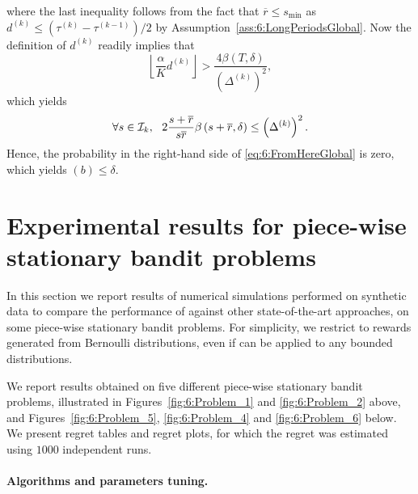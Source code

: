%
where the last inequality follows from the fact that $\overline{r} \leq s_{\min}$ as $d^{(k)} \leq (\tau^{(k)} - \tau^{(k-1)})/2$ by Assumption~\ref{ass:6:LongPeriodsGlobal}. Now the definition of $d^{(k)}$ readily implies that
\[\left\lfloor \frac{\alpha}{K}d^{(k)}\right\rfloor > \frac{4\beta(T,\delta)}{\left(\Delta^{(k)}\right)^2},\]
which yields
\[\forall s \in \cI_k, \ \ 2\frac{s+\overline{r}}{s\overline{r}}\beta\left(s+\overline{r}, \delta\right) \leq \left(\Delta^{(k)}\right)^2.\]
%
Hence, the probability in the right-hand side of \eqref{eq:6:FromHereGlobal} is zero, which yields $(b) \leq \delta$.





\section{Experimental results for piece-wise stationary bandit problems}
\label{sec:6:NumericalExperiments}

In this section we report results of numerical simulations performed on synthetic data to compare the performance of \GLRklUCB{} against other state-of-the-art approaches, on some piece-wise stationary bandit problems.
%
For simplicity, we restrict to rewards generated from Bernoulli distributions, even if \GLRklUCB{} can be applied to any bounded distributions.


We report results obtained on five different piece-wise stationary bandit problems, illustrated in Figures~\ref{fig:6:Problem_1} and \ref{fig:6:Problem_2} above, and Figures~\ref{fig:6:Problem_5}, \ref{fig:6:Problem_4} and \ref{fig:6:Problem_6} below.
We present regret tables and regret plots,
for which the regret was estimated using $1000$ independent runs.


\paragraph{Algorithms and parameters tuning.}
\label{sub:6:ParametersTuning}

